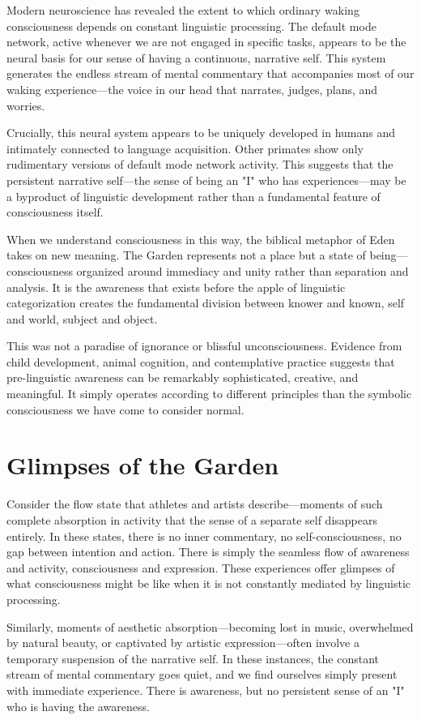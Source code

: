 Modern neuroscience has revealed the extent to which ordinary waking consciousness depends on constant linguistic processing. The default mode network, active whenever we are not engaged in specific tasks, appears to be the neural basis for our sense of having a continuous, narrative self. This system generates the endless stream of mental commentary that accompanies most of our waking experience—the voice in our head that narrates, judges, plans, and worries.

Crucially, this neural system appears to be uniquely developed in humans and intimately connected to language acquisition. Other primates show only rudimentary versions of default mode network activity. This suggests that the persistent narrative self—the sense of being an "I" who has experiences—may be a byproduct of linguistic development rather than a fundamental feature of consciousness itself.

When we understand consciousness in this way, the biblical metaphor of Eden takes on new meaning. The Garden represents not a place but a state of being—consciousness organized around immediacy and unity rather than separation and analysis. It is the awareness that exists before the apple of linguistic categorization creates the fundamental division between knower and known, self and world, subject and object.

This was not a paradise of ignorance or blissful unconsciousness. Evidence from child development, animal cognition, and contemplative practice suggests that pre-linguistic awareness can be remarkably sophisticated, creative, and meaningful. It simply operates according to different principles than the symbolic consciousness we have come to consider normal.

\section{Glimpses of the Garden}

Consider the flow state that athletes and artists describe—moments of such complete absorption in activity that the sense of a separate self disappears entirely. In these states, there is no inner commentary, no self-consciousness, no gap between intention and action. There is simply the seamless flow of awareness and activity, consciousness and expression. These experiences offer glimpses of what consciousness might be like when it is not constantly mediated by linguistic processing.

Similarly, moments of aesthetic absorption—becoming lost in music, overwhelmed by natural beauty, or captivated by artistic expression—often involve a temporary suspension of the narrative self. In these instances, the constant stream of mental commentary goes quiet, and we find ourselves simply present with immediate experience. There is awareness, but no persistent sense of an "I" who is having the awareness.

